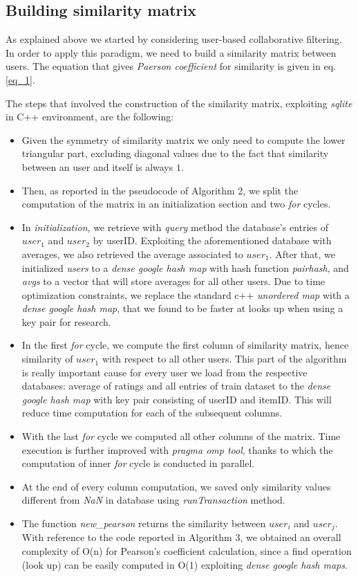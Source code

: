 \subsection{Building similarity matrix}

As explained above we started by considering user-based collaborative filtering. In order to apply this paradigm, we need to build a similarity matrix between users. The equation that gives \textit{Paerson coefficient} for similarity is given in eq. \ref{eq_1}.

The steps that involved the construction of the similarity matrix, exploiting \textit{sqlite} in C++ environment, are the following:

\begin{itemize}
	\item Given the symmetry of similarity matrix we only need to compute the lower triangular part, excluding diagonal values due to the fact that similarity between an user and itself is always $1$. 
	\item Then, as reported in the pseudocode of Algorithm 2, we split the computation of the matrix in an initialization section and two \textit{for} cycles.
	\item In \textit{initialization}, we retrieve with \textit{query} method the database's entries of $user_1$ and $user_2$ by userID. Exploiting the aforementioned database with averages, we also retrieved the average associated to $user_1$. After that, we initialized \textit{users} to a \textit{dense google hash map} with hash function \textit{pairhash}, and \textit{avgs} to a vector that will store averages for all other users.
	Due to time optimization constraints, we replace the standard c++ \textit{unordered map} with a \textit{dense google hash map}, that we found to be faster at looks up when using a key pair for research.
	\item In the first \textit{for} cycle, we compute the first column of similarity matrix, hence similarity of $user_1$ with respect to all other users. This part of the algorithm is really important cause for every user we load from the respective databases: average of ratings and all entries of train dataset to the \textit{dense google hash map} with key pair consisting of userID and itemID. This will reduce time computation for each of the subsequent columns.
	\item With the last \textit{for} cycle we computed all other columns of the matrix. Time execution is further improved with \textit{pragma omp tool}, thanks to which the computation of inner \textit{for} cycle is conducted in parallel.
	\item At the end of every column computation, we saved only similarity values different from \textit{NaN} in database using \textit{runTransaction} method.
	\item The function \textit{new\_pearson} returns the similarity between $user_i$ and $user_j$. With reference to the code reported in Algorithm 3, we obtained an overall complexity of O(n) for Pearson's coefficient calculation, since a find operation (look up) can be easily computed in O(1) exploiting \textit{dense google hash maps}.
\end{itemize}

